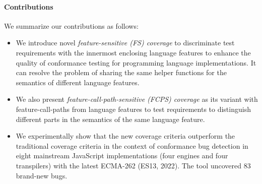 \paragraph{\textbf{Contributions}}
We summarize our contributions as follows:
\begin{itemize}
  \item
    We introduce novel \textit{feature-sensitive (FS) coverage} to discriminate
    test requirements with the innermost enclosing language features to enhance
    the quality of conformance testing for programming language implementations.
    It can resolve the problem of sharing the same helper
    functions for the semantics of different language features.
  \item 
    We also present \textit{feature-call-path-sensitive (FCPS) coverage} as its
    variant with feature-call-paths from language features to test requirements
    to distinguish different parts in the semantics of the same language feature.
  \item
    We experimentally show that the new coverage criteria outperform
    the traditional coverage criteria in the
    context of conformance bug detection in eight mainstream
    JavaScript implementations (four engines and four transpilers) with the latest ECMA-262
    (ES13, 2022). The tool uncovered 83 brand-new bugs.
\end{itemize}
